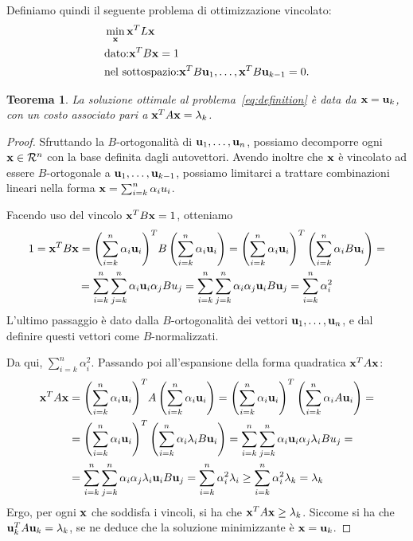 \documentclass[10pt,a4paper]{article}
\newtheorem{theorem}{Teorema}[section]
\newtheorem{proof}{Dimostrazione}[section]
\begin{document}
Definiamo quindi il seguente problema di ottimizzazione vincolato:
\begin{align}
    & \min_{\vb{x}} \vb{x}^T L\vb{x} \label{eq:definition}\\
    & \text{dato:} \vb{x}^T B\vb{x} = 1 \\
    & \text{nel sottospazio:} \vb{x}^T B \vb{u}_1,\ldots, \vb{x}^T B \vb{u}_{k-1} = 0.
\end{align}

\begin{theorem}\label{thr:soluzione_ottimizzazione}
    La soluzione ottimale al problema~\eqref{eq:definition} è data da \(\vb{x}=\vb{u}_k\), con un costo associato pari a \(\vb{x}^T A \vb{x} = \lambda_k\).
\end{theorem}
\begin{proof}
    Sfruttando la \(B\)-ortogonalità di \(\vb{u}_1,\ldots,\vb{u}_n\), possiamo decomporre ogni \(\vb{x} \in \mathcal{R}^n\) con la base definita dagli autovettori. Avendo inoltre che \(\vb{x}\) è vincolato ad essere \(B\)-ortogonale a \(\vb{u}_1,\ldots,\vb{u}_{k-1}\), possiamo limitarci a trattare combinazioni lineari nella forma \(\vb{x} = \sum_{i=k}^n \alpha_i u_i\).

    Facendo uso del vincolo \(\vb{x}^T B\vb{x} = 1\), otteniamo
    \begin{multline}
        1 = \vb{x}^T B\vb{x} = {\left(\sum_{i=k}^n \alpha_i \vb{u}_i\right)}^T B \left(\sum_{i=k}^n \alpha_i \vb{u}_i\right) = {\left(\sum_{i=k}^n \alpha_i \vb{u}_i\right)}^T \left(\sum_{i=k}^n \alpha_i B \vb{u}_i\right) = \\
        = \sum_{i=k}^n\sum_{j=k}^n \alpha_i \vb{u}_i \alpha_j B u_j = \sum_{i=k}^n\sum_{j=k}^n \alpha_i \alpha_j \vb{u}_i B \vb{u}_j = \sum_{i=k}^n \alpha_i^2
    \end{multline}
    L'ultimo passaggio è dato dalla \(B\)-ortogonalità dei vettori \(\vb{u}_1,\ldots,\vb{u}_n\), e dal definire questi vettori come \(B\)-normalizzati.

    Da qui, \(\sum_{i=k}^n \alpha_i^2\).
    Passando poi all'espansione della forma quadratica \(\vb{x}^T A \vb{x}\):
    \begin{align}
        \vb{x}^T A \vb{x} &= {\left(\sum_{i=k}^n \alpha_i \vb{u}_i\right)}^T A \left(\sum_{i=k}^n \alpha_i \vb{u}_i\right) = {\left(\sum_{i=k}^n \alpha_i \vb{u}_i\right)}^T \left(\sum_{i=k}^n \alpha_i A \vb{u}_i\right) = \\
        &= {\left(\sum_{i=k}^n \alpha_i \vb{u}_i\right)}^T \left(\sum_{i=k}^n \alpha_i \lambda_i B \vb{u}_i\right) = \sum_{i=k}^n\sum_{j=k}^n \alpha_i \vb{u}_i \alpha_j \lambda_i B u_j = \\
        &= \sum_{i=k}^n\sum_{j=k}^n \alpha_i\alpha_j \lambda_i\vb{u}_i B \vb{u}_j = \sum_{i=k}^n \alpha_i^2 \lambda_i \geq \sum_{i=k}^n \alpha_i^2 \lambda_k = \lambda_k
    \end{align}
    Ergo, per ogni \(\vb{x}\) che soddisfa i vincoli, si ha che \(\vb{x}^T A \vb{x} \geq \lambda_k\). Siccome si ha che \(\vb{u}_k^T A \vb{u}_k = \lambda_k\), se ne deduce che la soluzione minimizzante è \(\vb{x} = \vb{u}_k\).
\end{proof}
\end{document}

